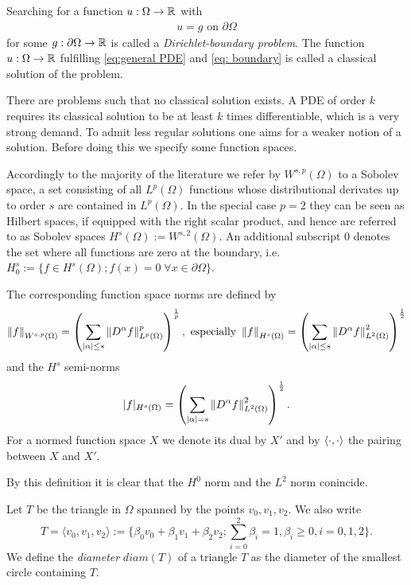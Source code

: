 Searching for a function $u:\Omega \rightarrow \mathbb{R}$ with 
\begin{align}
u=g \text{ on } \partial \Omega \label{eq: boundary}
\end{align}
for some $g:\partial \Omega \rightarrow \mathbb{R}$ is called a \emph{Dirichlet-boundary problem}. The function $u:\Omega \rightarrow \mathbb{R}$ fulfilling \eqref{eq:general PDE} and \eqref{eq: boundary} is called a classical solution of the problem. 

There are problems such that no classical solution exists. A PDE of order $k$ requires its classical solution to be at least $k$ times differentiable, which is a very strong demand. To admit less regular solutions one aims for a weaker notion of a solution. Before doing this we specify some function spaces.

\begin{definition} \label{def: function spaces and norms}
Accordingly to the majority of the literature we refer by $W^{s,p}(\Omega)$ to a Sobolev space, a set consisting of all $L^p(\Omega)$ functions whose distributional derivates up to order $s$ are contained in $L^ p(\Omega)$.
In the special case $p=2$ they can be seen as Hilbert spaces, if equipped with the right scalar product, and hence are referred to as Sobolev spaces $H^s(\Omega):=W^{s,2}(\Omega)$. An additional subscript $0$ denotes the set where all functions are zero at the boundary, i.e. $H^s_0 :=\{f \in H^s(\Omega); f(x)=0 \; \forall x \in \partial \Omega\}$.

The corresponding function space norms are defined by
\[
	\left\lVert f \right\rVert _{W^{s,p}(\Omega)} = \left( \sum_{|\alpha| \leq s} \left\lVert D^\alpha f \right\rVert^p_{L^p(\Omega)}\right)^{\frac 1 p }, \text{   especially } \left\lVert f \right\rVert _{H^{s}(\Omega)}=\left( \sum_{|\alpha| \leq s} \left\lVert D^\alpha f \right\rVert^2_{L^2(\Omega)}\right)^{\frac 1 2 }
\]
and the $H^s$ semi-norms
\[ 
 	|f|_{H^{s}(\Omega)}=\left( \sum_{|\alpha| = s} \left\lVert D^\alpha f \right\rVert^2_{L^2(\Omega)}\right)^{\frac 1 2 }.
\]
For a normed function space $X$ we denote its dual by $X'$ and by $ \langle \cdot, \cdot \rangle$ the pairing between $X$ and $X'$.

\end{definition}
By this definition it is clear that the $H^0$ norm and the $L^2$ norm conincide. 

Let $T$ be the triangle in $\Omega$ spanned by the points $v_0, v_1, v_2$. We also write 
\[
	T= \langle v_0, v_1, v_2 \rangle := \{\beta_0 v_0+ \beta_1 v_1 +\beta_2 v_2; \sum_{i=0}^2 \beta_i =1, \beta_i \geq 0, i= 0,1,2\}.
\]
We define the \emph{diameter} $diam(T)$ of a triangle $T$ as the diameter of the smallest circle containing $T$.

